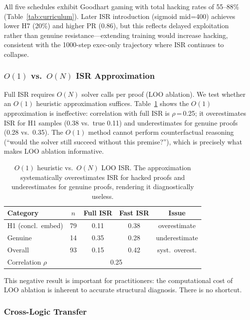 \documentclass[11pt,a4paper]{article}
\begin{document}
All five schedules exhibit Goodhart gaming with total hacking rates of 55--88\% (Table~\ref{tab:curriculum}).
Later ISR introduction (sigmoid mid=400) achieves lower H7 (20\%) and higher PR (0.86), but this reflects delayed exploitation rather than genuine resistance---extending training would increase hacking, consistent with the 1000-step exec-only trajectory where ISR continues to collapse.

\subsubsection{$O(1)$ vs.\ $O(N)$ ISR Approximation}
\label{sec:o1_ablation}

Full ISR requires $O(N)$ solver calls per proof (LOO ablation).
We test whether an $O(1)$ heuristic approximation suffices.
Table~\ref{tab:o1_vs_on} shows the $O(1)$ approximation is ineffective: correlation with full ISR is $\rho$\,=\,0.25; it overestimates ISR for H1 samples (0.38 vs.\ true 0.11) and underestimates for genuine proofs (0.28 vs.\ 0.35).
The $O(1)$ method cannot perform counterfactual reasoning (``would the solver still succeed without this premise?''), which is precisely what makes LOO ablation informative.

\begin{table}[t]
\centering
\small
\setlength{\tabcolsep}{3pt}
\begin{tabular}{lcccc}
\toprule
\textbf{Category} & $n$ & \textbf{Full ISR} & \textbf{Fast ISR} & \textbf{Issue} \\
\midrule
H1 (concl.\ embed) & 79 & 0.11 & 0.38 & overestimate \\
Genuine & 14 & 0.35 & 0.28 & underestimate \\
Overall & 93 & 0.15 & 0.42 & syst.\ overest. \\
\midrule
\multicolumn{2}{l}{Correlation $\rho$} & \multicolumn{2}{c}{0.25} & \\
\bottomrule
\end{tabular}
\caption{$O(1)$ heuristic vs.\ $O(N)$ LOO ISR. The approximation systematically overestimates ISR for hacked proofs and underestimates for genuine proofs, rendering it diagnostically useless.}
\label{tab:o1_vs_on}
\end{table}

This negative result is important for practitioners: the computational cost of LOO ablation is inherent to accurate structural diagnosis. There is no shortcut.

\subsubsection{Cross-Logic Transfer}
\label{sec:transfer}
\end{document}
